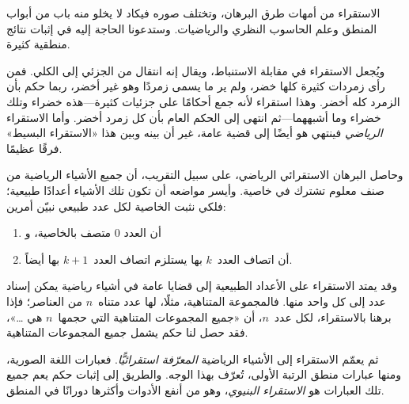 \documentclass[../../../include/open-logic-section]{subfiles}
\begin{document}


الاستقراء من أمهات طرق البرهان، وتختلف صوره فيكاد لا يخلو منه باب من
أبواب المنطق وعلم الحاسوب النظري والرياضيات. وستدعونا الحاجة إليه في
إثبات نتائج منطقية كثيرة.

ويُجعل الاستقراء في مقابلة الاستنباط، ويقال إنه انتقال من الجزئي إلى
الكلي. فمن رأى زمردات كثيرة كلها خضر، ولم ير ما يسمى زمردًا وهو غير
أخضر، ربما حكم بأن الزمرد كله أخضر. وهذا استقراء لأنه جمع أحكامًا على
جزئيات كثيرة---هذه خضراء وتلك خضراء وما أشبههما---ثم انتهى إلى الحكم
العام بأن كل زمرد أخضر. وأما الاستقراء \emph{الرياضي} فينتهي هو أيضًا
إلى قضية عامة، غير أن بينه وبين هذا «الاستقراء البسيط» فرقًا عظيمًا.

وحاصل البرهان الاستقرائي الرياضي، على سبيل التقريب، أن جميع الأشياء
الرياضية من صنف معلوم تشترك في خاصية. وأيسر مواضعه أن تكون تلك
الأشياء أعدادًا طبيعية؛ فلكي نثبت الخاصية لكل عدد طبيعي نبيّن أمرين:
\begin{enumerate}
    \item أن العدد $0$ متصف بالخاصية، و
    \item أن اتصاف العدد~$k$ بها يستلزم اتصاف العدد~$k+1$ بها أيضاً.
\end{enumerate}
وقد يمتد الاستقراء على الأعداد الطبيعية إلى قضايا عامة في أشياء
رياضية يمكن إسناد عدد إلى كل واحد منها. فالمجموعة المتناهية، مثلًا،
لها عدد متناه~$n$ من العناصر؛ فإذا برهنا بالاستقراء، لكل عدد~$n$، أن
«جميع المجموعات المتناهية التي حجمها~$n$ هي \dots»، فقد حصل لنا حكم
يشمل جميع المجموعات المتناهية.

ثم يعمّم الاستقراء إلى الأشياء الرياضية \emph{المعرّفة استقرائيًّا}.
فعبارات اللغة الصورية، ومنها عبارات منطق الرتبة الأولى، تُعرّف بهذا
الوجه. والطريق إلى إثبات حكم يعم جميع تلك العبارات هو
\emph{الاستقراء البنيوي}، وهو من أنفع الأدوات وأكثرها دورانًا في
المنطق.
\end{document}
